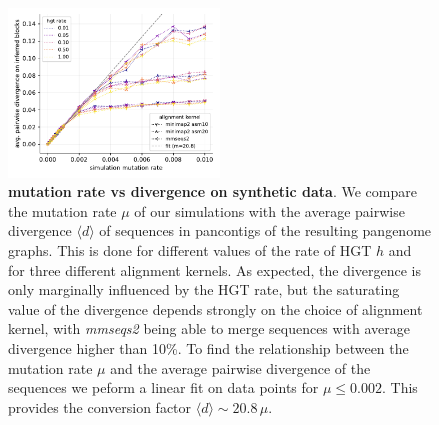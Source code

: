 \documentclass[aps,rmp,reprint,superscriptaddress,notitlepage,10pt,onecolumn]{revtex4-1}
\newcommand{\avg}[1]{\langle #1 \rangle}
\begin{document}
\begin{figure}[htb]
    \includegraphics[width=0.5\textwidth]{figs_suppl/snps_rate_vs_divergence.pdf}
    \caption{{\bf mutation rate vs divergence on synthetic data}. We compare the mutation rate $\mu$ of our simulations with the average pairwise divergence $\avg{d}$ of sequences in pancontigs of the resulting pangenome graphs. This is done for different values of the rate of HGT $h$ and for three different alignment kernels. As expected, the divergence is only marginally influenced by the HGT rate, but the saturating value of the divergence depends strongly on the choice of alignment kernel, with \textit{mmseqs2} being able to merge sequences with average divergence higher than 10\%. To find the relationship between the mutation rate $\mu$ and the average pairwise divergence of the sequences we peform a linear fit on data points for $\mu \leq 0.002$. This provides the conversion factor $\avg{d} \sim 20.8 \, \mu$.}
    \label{fig:snps-suppl}
\end{figure}
\end{document}
